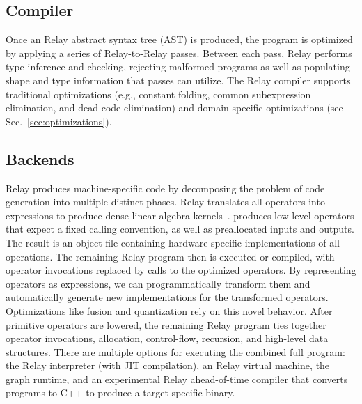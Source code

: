   \subsection*{Compiler}
  Once an Relay abstract syntax tree (AST) is produced,
    the program is optimized by applying a series of Relay-to-Relay
    passes.
  Between each pass, Relay performs type inference and checking,
    rejecting malformed programs as well as populating shape and type
    information that passes can utilize.
  The Relay compiler supports traditional optimizations
    (e.g., constant folding, common subexpression elimination, and dead code elimination)
    and domain-specific optimizations
    (see Sec.~\ref{sec:optimizations}).

  \subsection*{Backends}


  Relay produces machine-specific code
    by decomposing the problem of code generation into multiple distinct phases.
  Relay translates all operators into \tvm expressions
    to produce dense linear algebra kernels~\citep{tvm_osdi18, tensor_comprehensions, halide}.
  \tvm produces low-level operators that expect a fixed calling convention,
    as well as preallocated inputs and outputs.
  The result is an object file containing hardware-specific implementations of all
    operations.
  The remaining Relay program then is executed or compiled,
    with operator invocations replaced by calls to the optimized operators.
  By representing operators as \tvm expressions, we can programmatically
    transform them and automatically generate new implementations for the transformed operators.
  Optimizations like fusion and quantization
    rely on this novel behavior.
  After primitive operators are lowered,
    the remaining Relay program ties
    together operator invocations, allocation, control-flow,
    recursion, and high-level data structures.
  There are multiple options for executing the combined full program:
    the Relay interpreter (with JIT compilation),
    an Relay virtual machine,
    the \tvm graph runtime,
    and an experimental Relay ahead-of-time compiler
    that converts programs to C++ to produce a target-specific binary.

